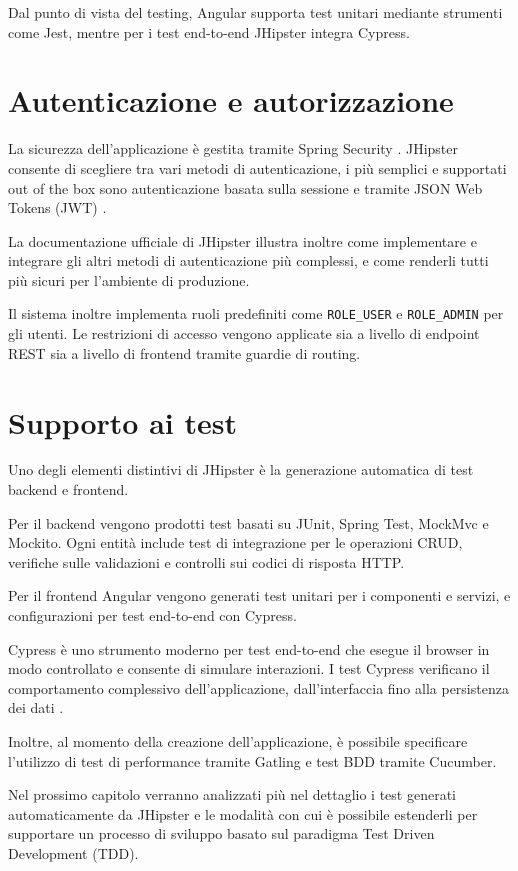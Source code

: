 Dal punto di vista del testing, Angular supporta test unitari mediante strumenti come Jest, mentre per i test end-to-end JHipster integra Cypress.

\section{Autenticazione e autorizzazione}

La sicurezza dell’applicazione è gestita tramite Spring Security \cite{SpringSecurityDocs}. JHipster consente di scegliere tra vari metodi di autenticazione, i più semplici e supportati out of the box sono autenticazione basata sulla sessione e tramite JSON Web Tokens (JWT) \cite{RFC7519}.

La documentazione ufficiale di JHipster illustra inoltre come implementare e integrare gli altri metodi di autenticazione più complessi, e come renderli tutti più sicuri per l'ambiente di produzione.

Il sistema inoltre implementa ruoli predefiniti come \texttt{ROLE\_USER} e \texttt{ROLE\_ADMIN} per gli utenti. Le restrizioni di accesso vengono applicate sia a livello di endpoint REST sia a livello di frontend tramite guardie di routing.

\section{Supporto ai test}

Uno degli elementi distintivi di JHipster è la generazione automatica di test backend e frontend.

Per il backend vengono prodotti test basati su JUnit, Spring Test, MockMvc e Mockito. Ogni entità include test di integrazione per le operazioni CRUD, verifiche sulle validazioni e controlli sui codici di risposta HTTP.

Per il frontend Angular vengono generati test unitari per i componenti e servizi, e configurazioni per test end-to-end con Cypress.

Cypress è uno strumento moderno per test end-to-end che esegue il browser in modo controllato e consente di simulare interazioni. I test Cypress verificano il comportamento complessivo dell’applicazione, dall’interfaccia fino alla persistenza dei dati \cite{CypressDocs}.

Inoltre, al momento della creazione dell'applicazione, è possibile specificare l'utilizzo di test di performance tramite Gatling e test BDD tramite Cucumber.

Nel prossimo capitolo verranno analizzati più nel dettaglio i test generati automaticamente da JHipster e le modalità con cui è possibile estenderli per supportare un processo di sviluppo basato sul paradigma Test Driven Development (TDD).

